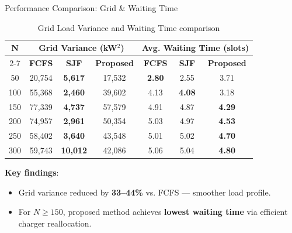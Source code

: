 \documentclass{beamer}
\begin{document}
\begin{frame}{Performance Comparison: Grid \& Waiting Time}
  \begin{table}[]
  \centering
  \footnotesize
  \begin{tabular}{|c|c|c|c|c|c|c|}
  \hline
  \multirow{2}{*}{\textbf{N}} & \multicolumn{3}{c|}{\textbf{Grid Variance (kW$^2$)}} & \multicolumn{3}{c|}{\textbf{Avg. Waiting Time (slots)}} \\
  \cline{2-7}
   & \textbf{FCFS} & \textbf{SJF} & \textbf{Proposed} & \textbf{FCFS} & \textbf{SJF} & \textbf{Proposed} \\
  \hline
  50  & 20,754  & \textbf{5,617}  & 17,532  & \textbf{2.80} & 2.55  & 3.71  \\
  \hline
  100 & 55,368  & \textbf{2,460}  & 39,602  & 4.13 & \textbf{4.08} & 3.18  \\
  \hline
  150 & 77,339  & \textbf{4,737}  & 57,579  & 4.91 & 4.87 & \textbf{4.29}  \\
  \hline
  200 & 74,957  & \textbf{2,961}  & 50,354  & 5.03 & 4.97 & \textbf{4.53}  \\
  \hline
  250 & 58,402  & \textbf{3,640}  & 43,548  & 5.01 & 5.02 & \textbf{4.70}  \\
  \hline
  300 & 59,743  & \textbf{10,012} & 42,086  & 5.06 & 5.04 & \textbf{4.80}  \\
  \hline
  \end{tabular}
  \caption{Grid Load Variance and Waiting Time comparison}
  \end{table}
  \textbf{Key findings}:
  \begin{itemize}
      \item Grid variance reduced by \textbf{33--44\%} vs. FCFS --- smoother load profile.
      \item For $N \geq 150$, proposed method achieves \textbf{lowest waiting time} via efficient charger reallocation.
  \end{itemize}
\end{frame}
\end{document}
